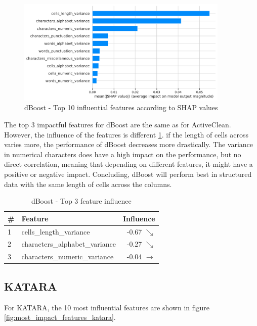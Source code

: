 \begin{figure}[H]
    \centering
    \includegraphics[width=0.9\textwidth]{thesis/Figures/RQ4/Shap_cell_f1_dBoost.pdf}
    \caption{dBoost - Top 10 influential features according to SHAP values}
    \label{fig:most_impact_features_dboost}
\end{figure}

The top 3 impactful features for dBoost are the same as for ActiveClean. However, the influence of the features is different \ref{tab:top_influence_features_dboost}. if the length of cells across varies more, the performance of dBoost decreases more drastically. The variance in numerical characters does have a high impact on the performance, but no direct correlation, meaning that depending on different features, it might have a positive or negative impact. 
Concluding, dBoost will perform best in structured data with the same length of cells across the columns.

\begin{table}[H]
\centering
\begin{tabular}{llr}
\toprule
 \# &                         Feature &            Influence \\
\midrule
 1 &         cells\_length\_variance &     -0.67 $\searrow$ \\
 2 &  characters\_alphabet\_variance &     -0.27 $\searrow$ \\
 3 &   characters\_numeric\_variance &  -0.04 $\rightarrow$ \\
\bottomrule
\end{tabular}
\caption{dBoost - Top 3 feature influence}
\label{tab:top_influence_features_dboost}
\end{table}


\subsection{KATARA}
For KATARA, the 10 most influential features are shown in figure \ref{fig:most_impact_features_katara}.

